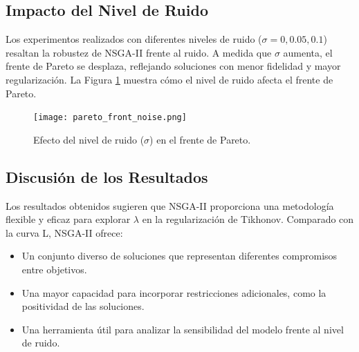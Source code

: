 \subsection{Impacto del Nivel de Ruido} \label{sec:results:noise}

Los experimentos realizados con diferentes niveles de ruido (\( \sigma = 0, 0.05, 0.1 \)) resaltan la robustez de NSGA-II frente al ruido. A medida que \( \sigma \) aumenta, el frente de Pareto se desplaza, reflejando soluciones con menor fidelidad y mayor regularización. La Figura \ref{fig:pareto_noise} muestra cómo el nivel de ruido afecta el frente de Pareto.

\begin{figure}[h]
    \centering
    \texttt{[image: pareto\_front\_noise.png]}
    \caption{Efecto del nivel de ruido (\( \sigma \)) en el frente de Pareto.}
    \label{fig:pareto_noise}
\end{figure}

\subsection{Discusión de los Resultados} \label{sec:results:discussion}

Los resultados obtenidos sugieren que NSGA-II proporciona una metodología flexible y eficaz para explorar \( \lambda \) en la regularización de Tikhonov. Comparado con la curva L, NSGA-II ofrece:
\begin{itemize}
    \item Un conjunto diverso de soluciones que representan diferentes compromisos entre objetivos.
    \item Una mayor capacidad para incorporar restricciones adicionales, como la positividad de las soluciones.
    \item Una herramienta útil para analizar la sensibilidad del modelo frente al nivel de ruido.
\end{itemize}
